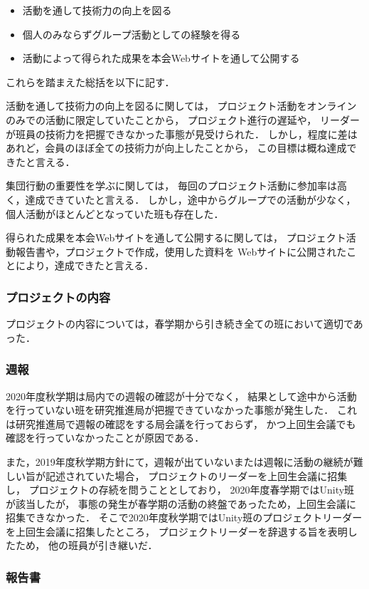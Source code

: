 \begin{itemize}
\item 活動を通して技術力の向上を図る
\item 個人のみならずグループ活動としての経験を得る
\item 活動によって得られた成果を本会Webサイトを通して公開する
\end{itemize}

これらを踏まえた総括を以下に記す．

活動を通して技術力の向上を図るに関しては，
プロジェクト活動をオンラインのみでの活動に限定していたことから，
プロジェクト進行の遅延や，
リーダーが班員の技術力を把握できなかった事態が見受けられた．
しかし，程度に差はあれど，会員のほぼ全ての技術力が向上したことから，
この目標は概ね達成できたと言える．

集団行動の重要性を学ぶに関しては，
毎回のプロジェクト活動に参加率は高く，達成できていたと言える．
しかし，途中からグループでの活動が少なく，個人活動がほとんどとなっていた班も存在した．

得られた成果を本会Webサイトを通して公開するに関しては，
プロジェクト活動報告書や，プロジェクトで作成，使用した資料を
Webサイトに公開されたことにより，達成できたと言える．

\subsubsection*{プロジェクトの内容}
プロジェクトの内容については，春学期から引き続き全ての班において適切であった．

\subsubsection*{週報}
2020年度秋学期は局内での週報の確認が十分でなく，
結果として途中から活動を行っていない班を研究推進局が把握できていなかった事態が発生した．
これは研究推進局で週報の確認をする局会議を行っておらず，
かつ上回生会議でも確認を行っていなかったことが原因である．

また，2019年度秋学期方針にて，週報が出ていないまたは週報に活動の継続が難しい旨が記述されていた場合，
プロジェクトのリーダーを上回生会議に招集し，
プロジェクトの存続を問うこととしており，
2020年度春学期ではUnity班が該当したが，
事態の発生が春学期の活動の終盤であったため，上回生会議に招集できなかった．
そこで2020年度秋学期ではUnity班のプロジェクトリーダーを上回生会議に招集したところ，
プロジェクトリーダーを辞退する旨を表明したため，
他の班員が引き継いだ．

\subsubsection*{報告書}

